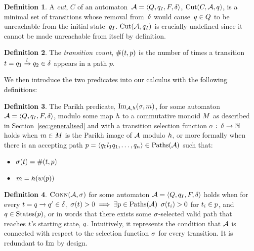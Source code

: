 \documentclass[acmsmall,review,anonymous,screen]{acmart}\settopmatter{printfolios=true,printccs=false,printacmref=true}
\theoremstyle{definition}
\newtheorem{definition}{Definition}[section]
\begin{document}
\begin{definition}
  A \textit{cut}, $C$ of an automaton~$\mathcal{A} = \left\langle Q, q_I, F, \delta\right\rangle$,
  $\operatorname{Cut}(C, \mathcal{A}, q)$, is a minimal set of transitions whose
  removal from~$\delta$ would cause~$q \in Q$ to be unreachable
  from the initial state~$q_I$. $\operatorname{Cut}(\mathcal{A},
  q_I)$ is crucially undefined since it cannot be made unreachable
  from itself by definition.
\end{definition}

\begin{definition}
 The \textit{transition count}, $\operatorname{\#}(t, p)$ is the
 number of times a transition $t =
 q_1 \xrightarrow{l} q_2 \in \delta$ appears in a path
 $p$.
\end{definition}

We then introduce the two predicates into our calculus with the following
definitions:

\begin{definition}\label{def:single-image}
  The Parikh predicate, $\operatorname{Im}_{\mathcal{A}, h}(\operatorname{\sigma}, m)$, for some automaton
  $\mathcal{A} = \left\langle Q, q_I, F, \delta\right\rangle$, modulo some map $h$ to a commutative monoid
  $M$ as described in Section~\ref{sec:generalised} and with a transition
  selection function $\operatorname{\sigma}:\: \delta \to \mathbb{N}$ holds when
  $m \in M$ is the Parikh image of $\mathcal{A}$ modulo
  $h$, or more formally when there is an accepting path $p =
  \left\langle q_0 l_1 q_1 , \ldots , q_n\right\rangle \in \operatorname{Paths}(\mathcal{A})$ such that:
  \begin{itemize}
    \item $\operatorname{\sigma}(t) = \operatorname{\#}(t, p)$
    \item $m = h(w(p))$
  \end{itemize}
\end{definition}

\begin{definition}
  $\operatorname{\textsc{Conn}}(\mathcal{A}, \operatorname{\sigma})$ for some automaton $\mathcal{A} =
  \left\langle Q, q_I, F, \delta\right\rangle$ holds when for every $t =
  q \xrightarrow{} q' \in \delta$, $\operatorname{\sigma}(t) > 0
  \implies \exists p \in \operatorname{Paths}(\mathcal{A})$ $\operatorname{\sigma}(t_i) > 0$
  for $t_i \in p$, and $q \in \operatorname{States}(p)$, or in words that
  there exists some $\operatorname{\sigma}$-selected valid path that reaches $t$'s
  starting state, $q$. Intuitively, it represents the condition that
  $\mathcal{A}$ is connected with respect to the selection function $\operatorname{\sigma}$ for
  every transition. It is redundant to $\operatorname{Im}$ by design.
\end{definition}
\end{document}
